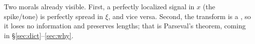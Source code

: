\begin{strand}
Two morals already visible. First, a perfectly localized signal in $x$ (the spike/tone) is
perfectly spread in $\xi$, and vice versa. Second, the transform is a , so it loses no information and preserves lengths; that is Parseval's theorem,
coming in §\ref{sec:dict}--\ref{sec:why}.
\end{strand}

